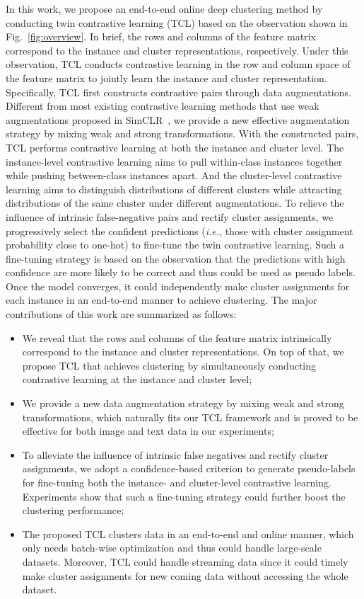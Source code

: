 In this work, we propose an end-to-end online deep clustering method by conducting twin contrastive learning (TCL) based on the observation shown in Fig.~\ref{fig:overview}. In brief, the rows and columns of the feature matrix correspond to the instance and cluster representations, respectively. Under this observation, TCL conducts contrastive learning in the row and column space of the feature matrix to jointly learn the instance and cluster representation. Specifically, TCL first constructs contrastive pairs through data augmentations. Different from most existing contrastive learning methods that use weak augmentations proposed in SimCLR~\citep{SimCLR}, we provide a new effective augmentation strategy by mixing weak and strong transformations. With the constructed pairs, TCL performs contrastive learning at both the instance and cluster level. The instance-level contrastive learning aims to pull within-class instances together while pushing between-class instances apart. And the cluster-level contrastive learning aims to distinguish distributions of different clusters while attracting distributions of the same cluster under different augmentations. To relieve the influence of intrinsic false-negative pairs and rectify cluster assignments, we progressively select the confident predictions (\textit{i.e.}, those with cluster assignment probability close to one-hot) to fine-tune the twin contrastive learning. Such a fine-tuning strategy is based on the observation that the predictions with high confidence are more likely to be correct and thus could be used as pseudo labels. Once the model converges, it could independently make cluster assignments for each instance in an end-to-end manner to achieve clustering. The major contributions of this work are summarized as follows:
 \begin{itemize}
 	\item We reveal that the rows and columns of the feature matrix intrinsically correspond to the instance and cluster representations. On top of that, we propose TCL that achieves clustering by simultaneously conducting contrastive learning at the instance and cluster level;
 	\item We provide a new data augmentation strategy by mixing weak and strong transformations, which naturally fits our TCL framework and is proved to be effective for both image and text data in our experiments;
 	\item To alleviate the influence of intrinsic false negatives and rectify cluster assignments, we adopt a confidence-based criterion to generate pseudo-labels for fine-tuning both the instance- and cluster-level contrastive learning. Experiments show that such a fine-tuning strategy could further boost the clustering performance;
 	\item The proposed TCL clusters data in an end-to-end and online manner, which only needs batch-wise optimization and thus could handle large-scale datasets. Moreover, TCL could handle streaming data since it could timely make cluster assignments for new coming data without accessing the whole dataset.
\end{itemize}

